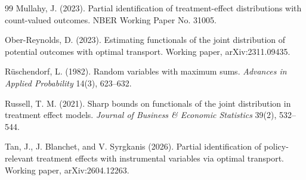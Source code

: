 \documentclass[11pt]{article}
\theoremstyle{definition}
\theoremstyle{plain}
\theoremstyle{remark}
\begin{document}
\begin{thebibliography}{99}
Mullahy, J. (2023).
Partial identification of treatment-effect distributions with count-valued outcomes.
NBER Working Paper No. 31005.

Ober-Reynolds, D. (2023).
Estimating functionals of the joint distribution of potential outcomes with optimal
transport.
Working paper, arXiv:2311.09435.

R\"uschendorf, L. (1982).
Random variables with maximum sums.
\emph{Advances in Applied Probability} 14(3), 623--632.

Russell, T. M. (2021).
Sharp bounds on functionals of the joint distribution in treatment effect models.
\emph{Journal of Business \& Economic Statistics} 39(2), 532--544.

Tan, J., J. Blanchet, and V. Syrgkanis (2026).
Partial identification of policy-relevant treatment effects with instrumental variables
via optimal transport.
Working paper, arXiv:2604.12263.
\end{thebibliography}
\end{document}
